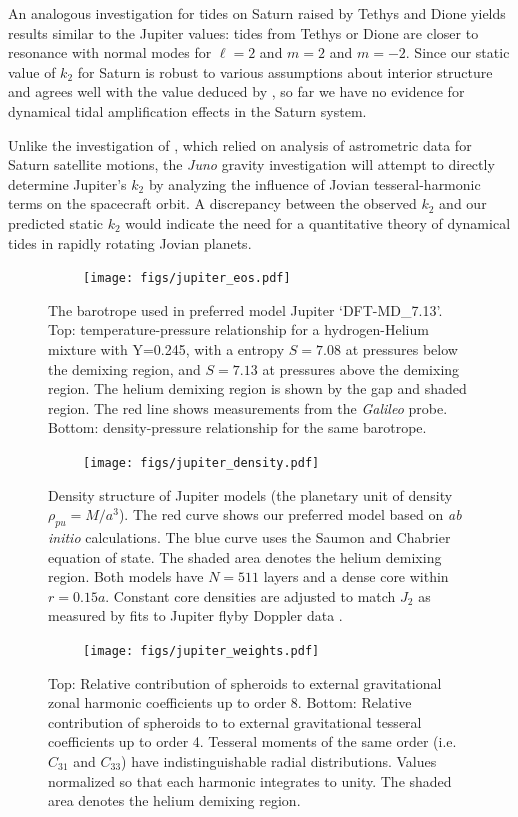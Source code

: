 An analogous investigation for tides on Saturn raised by
Tethys and Dione yields results similar to the Jupiter values:
tides from Tethys or Dione are closer to resonance with normal modes for $\ell=2$ and
$m=2$ and $m=-2$.  Since our static
value of $k_2$ for Saturn \citep{wahl2016} is robust to various assumptions about interior
structure and agrees well
with the value deduced by \citet{lainey2016}, so far we have no evidence for dynamical
tidal amplification effects in the Saturn system.  

Unlike the investigation of \citet{lainey2016}, which relied on analysis of astrometric data for
Saturn satellite motions, the \textit{Juno} gravity investigation will attempt to directly determine
Jupiter's $k_2$ by analyzing the influence of Jovian tesseral-harmonic terms on the spacecraft orbit.
A discrepancy
between the observed $k_2$ and our predicted static $k_2$
would indicate the need for
a quantitative theory of dynamical tides in rapidly rotating Jovian planets. 

\begin{figure}[h!]  
  \centering
    \texttt{[image: figs/jupiter\_eos.pdf]}
\caption{ The barotrope used in preferred model Jupiter `DFT-MD\_7.13'. Top:
    temperature-pressure relationship for a hydrogen-Helium mixture with Y=0.245,
    with a entropy $S=7.08$ at pressures below the demixing region, and $S=7.13$ at
    pressures above the demixing region. The helium demixing region is shown by the
    gap and shaded region. The red line shows measurements from the \textit{Galileo}
probe. Bottom: density-pressure relationship for the same barotrope.}
\label{fig:eos}
\end{figure}

\begin{figure}[h!]  
  \centering
    \texttt{[image: figs/jupiter\_density.pdf]}
\caption{   Density structure of Jupiter models (the planetary unit of
density $\rho_{pu}=M/a^3$).  The red curve shows our preferred
    model based on \textit{ab initio} calculations. The blue curve uses the Saumon and
    Chabrier equation of state. The shaded area denotes the helium demixing region.
    Both models have $N=511$ layers and a dense core within $r=0.15a$.  Constant core
    densities are adjusted to match $J_2$ as measured by fits to Jupiter flyby Doppler
    data \citep{jacobson2003}.}
\label{fig:density_structure}
\end{figure}

\begin{figure}[h!]  
  \centering
    \texttt{[image: figs/jupiter\_weights.pdf]}
\caption{Top: Relative contribution of spheroids to external gravitational zonal
    harmonic coefficients up to order 8. Bottom: Relative contribution of spheroids
    to to external gravitational tesseral coefficients up to order 4. Tesseral
    moments of the same order (i.e. $C_{31}$ and $C_{33}$) have indistinguishable
radial distributions. Values normalized so that each harmonic integrates to unity.
The shaded area denotes the helium demixing region.  }
\label{fig:jupiter_weights}
\end{figure}

